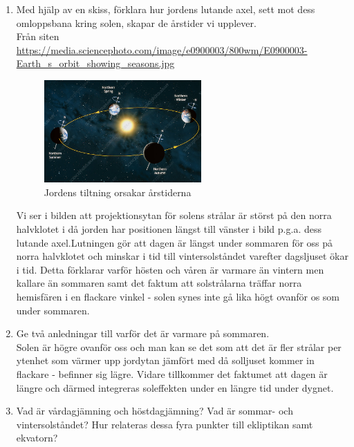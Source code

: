 \documentclass[./exercises.tex]{subfiles}
\begin{document}
\begin{enumerate}
Zenith är punkten rakt ovanför en observatör på en sfärisk kropp och är alltid 90 grader från horisonten\footnote{\url{https://www.astronomynotes.com/nakedeye/s4.htm}}
Det spelar ingen roll varifrån på horisonten man mäter. Underförstått i begreppet ``horisont'' är att det är en
horisontell rät linje. 

\item Med hjälp av en skiss, förklara hur jordens lutande axel, sett
mot dess omloppsbana kring solen, skapar de årstider vi upplever.\\

Från siten \url{https://media.sciencephoto.com/image/e0900003/800wm/E0900003-Earth_s_orbit_showing_seasons.jpg}
\begin{figure}[H]
\centering
  \includegraphics[width=60mm,scale=0.4]{E0900003-Earth_s_orbit_showing_seasons.jpg}
  \caption{Jordens tiltning orsakar årstiderna}
  \label{fig4}
\end{figure}
Vi ser i bilden att projektionsytan för solens strålar är störst på den norra halvklotet i då  jorden har 
positionen längst till vänster i bild p.g.a. dess lutande axel.Lutningen gör att dagen är längst under sommaren för oss på norra
halvklotet och minskar i tid till vintersolståndet varefter dagsljuset ökar i tid. Detta förklarar varför hösten och våren
är varmare än vintern men kallare än sommaren samt det faktum att solstrålarna träffar norra hemisfären i en flackare
vinkel - solen synes inte gå lika högt ovanför os som under sommaren.

\item Ge två anledningar till varför det är varmare på sommaren.\\
Solen är högre ovanför oss och man kan se det som att det är fler strålar per ytenhet som värmer upp jordytan jämfört med då
solljuset kommer in flackare - befinner sig lägre. Vidare tillkommer det faktumet att dagen är längre och därmed integreras
soleffekten under en längre tid under dygnet.

\item Vad är vårdagjämning och höstdagjämning?
Vad är sommar- och vintersolståndet?
Hur relateras dessa fyra punkter till ekliptikan samt ekvatorn?\\


\end{enumerate}
\end{document}
